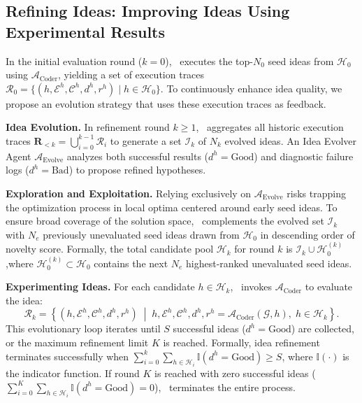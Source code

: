 \subsection{Refining Ideas: Improving Ideas Using Experimental Results}\label{subsec:refine_idea}

In the initial evaluation round ($k=0$), \sname~executes the top-$N_0$ seed ideas from $\mathcal{H}_0$ using $\mathcal{A}_{\mathrm{Coder}}$, yielding a set of execution traces $\mathcal{R}_0 = \{(h, \mathcal{E}^h, \mathcal{C}^h, d^h, r^h) \mid h \in \mathcal{H}_0\}$.
To continuously enhance idea quality, we propose an evolution strategy that uses these execution traces as feedback.

\noindent\textbf{Idea Evolution.}
In refinement round $k \ge 1$, \sname~aggregates all historic execution traces $\mathbf{R}_{<k} = \bigcup_{i=0}^{k-1} \mathcal{R}_i$ to generate a set $\mathcal{I}_k$ of $N_k$ evolved ideas.
An Idea Evolver Agent $\mathcal{A}_{\mathrm{Evolve}}$ analyzes both successful results ($d^h = \mathrm{Good}$) and diagnostic failure logs ($d^h = \mathrm{Bad}$) to propose refined hypotheses.

\noindent\textbf{Exploration and Exploitation.}
Relying exclusively on $\mathcal{A}_{\mathrm{Evolve}}$ risks trapping the optimization process in local optima centered around early seed ideas.
To ensure broad coverage of the solution space, \sname~complements the evolved set $\mathcal{I}_k$ with $N_e$ previously unevaluated seed ideas drawn from $\mathcal{H}_0$ in descending order of novelty score.
Formally, the total candidate pool $\mathcal{H}_k$ for round $k$ is $\mathcal{I}_k \cup \mathcal{H}_{0}^{(k)}$,where $\mathcal{H}_{0}^{(k)} \subset \mathcal{H}_0$ contains the next $N_e$ highest-ranked unevaluated seed ideas.


\noindent\textbf{Experimenting Ideas.}
For each candidate $h \in \mathcal{H}_k$, \sname~invokes $\mathcal{A}_{\mathrm{Coder}}$ to evaluate the idea:
\begin{equation}
    \mathcal{R}_k = \left\{ \left(h, \mathcal{E}^h, \mathcal{C}^h, d^h, r^h\right) \;\middle|\; h, \mathcal{E}^h, \mathcal{C}^h, d^h, r^h = \mathcal{A}_{\mathrm{Coder}}(\mathcal{G}, h), \; h \in \mathcal{H}_k \right\}.
\end{equation}
This evolutionary loop iterates until $S$ successful ideas ($d^h = \mathrm{Good}$) are collected, or the maximum refinement limit $K$ is reached.
Formally, idea refinement terminates successfully when $\sum_{i=0}^k \sum_{h \in \mathcal{H}_i} \mathbb{I}(d^h = \mathrm{Good}) \ge S$, where $\mathbb{I}(\cdot)$ is the indicator function.
If round $K$ is reached with zero successful ideas ($\sum_{i=0}^K \sum_{h \in \mathcal{H}_i} \mathbb{I}(d^h = \mathrm{Good}) = 0$), \sname~terminates the entire process.

